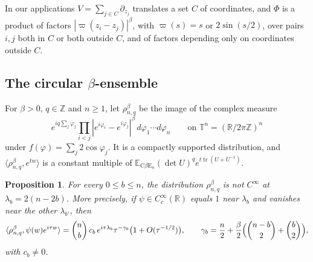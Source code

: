 \documentclass[11pt,a4paper]{article}
\newtheorem{proposition}[theorem]{Proposition}
\theoremstyle{definition}
\theoremstyle{remark}
\newcommand{\Z}{\mathbb Z}
\newcommand{\R}{\mathbb R}
\newcommand{\T}{\mathbb T}
\newcommand{\E}{\mathbb E}
\DeclareMathOperator{\tr}{tr}
\numberwithin{equation}{section}
\begin{document}
In our applications $V=\sum_{j\in C}\partial_{z_j}$ translates a set $C$ of coordinates, and $\Phi$ is a product of factors $|\varpi(z_i-z_j)|^\beta$, with $\varpi(s)=s$ or $2\sin(s/2)$, over pairs $i,j$ both in $C$ or both outside $C$, and of factors depending only on coordinates outside $C$.

\subsection{The circular \texorpdfstring{$\beta$}{beta}-ensemble}
For $\beta>0$, $q\in\Z$ and $n\ge1$, let $\rho^{\beta}_{n,q}$ be the image of the complex measure
\[
e^{iq\sum_j\varphi_j}\prod_{i<j}|e^{i\varphi_i}-e^{i\varphi_j}|^\beta\,d\varphi_1\cdots d\varphi_n\qquad\text{on }\T^n=(\R/2\pi\Z)^n
\]
under $f(\varphi)=\sum_j2\cos\varphi_j$. It is a compactly supported distribution, and $\langle\rho^\beta_{n,q},e^{tw}\rangle$ is a constant multiple of $\E_{\mathrm{C}\beta\mathrm{E}_n}(\det U)^qe^{t\tr(U+U^{-1})}$.

\begin{proposition}\label{V:prop:vis-cbe}
For every $0\le b\le n$, the distribution $\rho^\beta_{n,q}$ is not $C^\infty$ at $\lambda_b=2(n-2b)$. More precisely, if $\psi\in C^\infty_c(\R)$ equals $1$ near $\lambda_b$ and vanishes near the other $\lambda_{b'}$, then
\[
\langle\rho^\beta_{n,q},\psi(w)e^{i\tau w}\rangle=\binom nb\,c_b\,e^{i\tau\lambda_b}\tau^{-\gamma_b}\bigl(1+O(\tau^{-1/2})\bigr),\qquad\gamma_b=\frac n2+\frac\beta2\Bigl(\binom{n-b}2+\binom b2\Bigr),
\]
with $c_b\ne0$.
\end{proposition}
\end{document}
